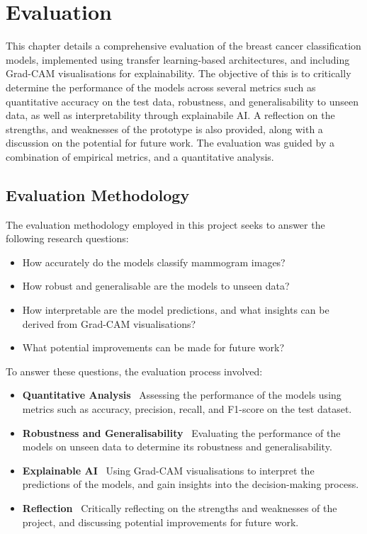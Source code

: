 \documentclass[../main]{subfiles}
\begin{document}
\chapter{Evaluation}
\label{ch:evaluation}
This chapter details a comprehensive evaluation of the breast cancer classification models, implemented using transfer learning-based architectures, and including Grad-CAM visualisations for explainability. The objective of this is to critically determine the performance of the models across several metrics such as quantitative accuracy on the test data, robustness, and generalisability to unseen data, as well as interpretability through explainabile AI. A reflection on the strengths, and weaknesses of the prototype is also provided, along with a discussion on the potential for future work. The evaluation was guided by a combination of empirical metrics, and a quantitative analysis.

\section{Evaluation Methodology}
\label{sec:evaluation-methodology}
The evaluation methodology employed in this project seeks to answer the following research questions:
\begin{itemize}
    \item How accurately do the models classify mammogram images?
    \item How robust and generalisable are the models to unseen data?
    \item How interpretable are the model predictions, and what insights can be derived from Grad-CAM visualisations?
    \item What potential improvements can be made for future work?
\end{itemize}

To answer these questions, the evaluation process involved:
\begin{itemize}
    \item \textbf{Quantitative Analysis} \textemdash\ Assessing the performance of the models using metrics such as accuracy, precision, recall, and F1-score on the test dataset.
    \item \textbf{Robustness and Generalisability} \textemdash\ Evaluating the performance of the models on unseen data to determine its robustness and generalisability.
    \item \textbf{Explainable AI} \textemdash\ Using Grad-CAM visualisations to interpret the predictions of the models, and gain insights into the decision-making process.
    \item \textbf{Reflection} \textemdash\ Critically reflecting on the strengths and weaknesses of the project, and discussing potential improvements for future work.
\end{itemize}
\end{document}

